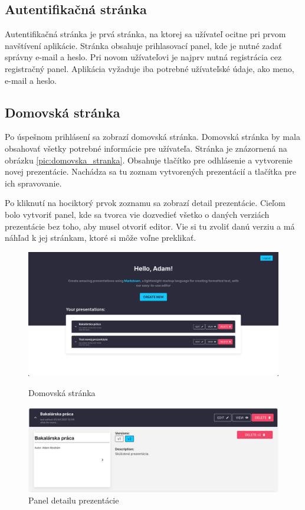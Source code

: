 \subsection*{Autentifikačná stránka}
Autentifikačná stránka je prvá stránka, na ktorej sa užívateľ ocitne pri prvom navštívení aplikácie. Stránka obsahuje prihlasovací panel, kde je nutné zadať správny e-mail a heslo. Pri novom užívateľovi je najprv nutná registrácia cez registračný panel. Aplikácia vyžaduje iba potrebné užívateľské údaje, ako meno, e-mail a heslo.

\subsection*{Domovská stránka}
Po úspešnom prihlásení sa zobrazí domovská stránka. Domovská stránka by mala obsahovať všetky potrebné informácie pre užívateľa. Stránka je znázornená na obrázku \ref{pic:domovska_stranka}. Obsahuje tlačítko pre odhlásenie a vytvorenie novej prezentácie. Nachádza sa tu zoznam vytvorených prezentácií a tlačítka pre ich spravovanie. 

Po kliknutí na hociktorý prvok zoznamu sa zobrazí detail prezentácie. Cieľom bolo vytvoriť panel, kde sa tvorca vie dozvedieť všetko o daných verziách prezentácie bez toho, aby musel otvoriť editor. Vie si tu zvoliť danú verziu a má náhľad k jej stránkam, ktoré si môže voľne preklikať.

\begin{figure}[!hbt]
\centering
\begin{minipage}{.5\textwidth}
  \centering
  \includegraphics[scale=0.1]{obrazky/domovska_stranka.png}
  \caption{Domovská stránka}
  \label{pic:domovska_stranka}
\end{minipage}%
\begin{minipage}{.5\textwidth}
  \centering
  \includegraphics[scale=0.15]{obrazky/detail_prezentacie.png}
  \caption{Panel detailu prezentácie}
  \label{pic:detail_prezentacie}
\end{minipage}
\end{figure}

